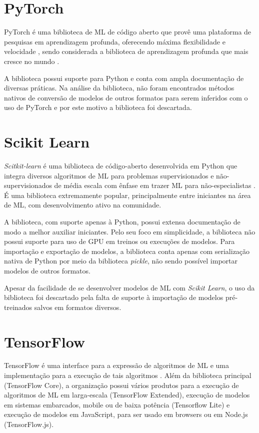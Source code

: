 \section{PyTorch}

PyTorch é uma biblioteca de ML de código aberto que provê uma plataforma de pesquisas em aprendizagem profunda, oferecendo máxima flexibilidade e velocidade \cite{pytorch_what_is}, sendo considerada a biblioteca de aprendizagem profunda que mais cresce no mundo \cite{course_fast_ai}.

A biblioteca possui suporte para Python e conta com ampla documentação de diversas práticas. Na análise da biblioteca, não foram encontrados métodos nativos de conversão de modelos de outros formatos para serem inferidos com o uso de PyTorch e por este motivo a biblioteca foi descartada.

\section{Scikit Learn}

\textit{Scitkit-learn} é uma biblioteca de código-aberto desenvolvida em Python que integra diversos algoritmos de ML para problemas supervisionados e não-supervisionados de média escala com ênfase em trazer ML para não-especialistas \cite{scikit-learn}. É uma biblioteca extremamente popular, principalmente entre iniciantes na área de ML, com desenvolvimento ativo na comunidade.

A biblioteca, com suporte apenas à Python, possui extensa documentação de modo a melhor auxiliar iniciantes. Pelo seu foco em simplicidade, a biblioteca não possui suporte para uso de GPU em treinos ou execuções de modelos. Para importação e exportação de modelos, a biblioteca conta apenas com serialização nativa de Python por meio da biblioteca \textit{pickle}, não sendo possível importar modelos de outros formatos.

Apesar da facilidade de se desenvolver modelos de ML com \textit{Scikit Learn}, o uso da biblioteca foi descartado pela falta de suporte à importação de modelos pré-treinados salvos em formatos diversos.

\section{TensorFlow}

TensorFlow é uma interface para a expressão de algoritmos de ML e uma implementação para a execução de tais algoritmos \cite{tensorflow-2015}. Além da biblioteca principal (TensorFlow Core), a organização possui vários produtos para a execução de algoritmos de ML em larga-escala (TensorFlow Extended), execução de modelos em sistemas embarcados, mobile ou de baixa potência (Tensorflow Lite) e execução de modelos em JavaScript, para ser usado em browsers ou em Node.js (TensorFlow.js).

